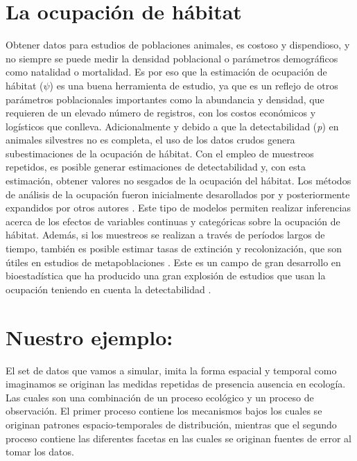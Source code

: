 \documentclass[]{book}
\begin{document}
\chapter{La ocupación de hábitat}\label{occu}

Obtener datos para estudios de poblaciones animales, es costoso y
dispendioso, y no siempre se puede medir la densidad poblacional o
parámetros demográficos como natalidad o mortalidad. Es por eso que la
estimación de ocupación de hábitat (\(\psi\)) es una buena herramienta
de estudio, ya que es un reflejo de otros parámetros poblacionales
importantes como la abundancia y densidad, que requieren de un elevado
número de registros, con los costos económicos y logísticos que
conlleva. Adicionalmente y debido a que la detectabilidad (\emph{p}) en
animales silvestres no es completa, el uso de los datos crudos genera
subestimaciones de la ocupación de hábitat. Con el empleo de muestreos
repetidos, es posible generar estimaciones de detectabilidad y, con esta
estimación, obtener valores no sesgados de la ocupación del hábitat. Los
métodos de análisis de la ocupación fueron inicialmente desarollados por
\citet{MacKenzie2002} y posteriormente expandidos por otros autores
\citep{MACKENZIE2005, MacKenzie2006, Kery2008, Royle2007a, Royle2005, Royle2006}.
Este tipo de modelos permiten realizar inferencias acerca de los efectos
de variables continuas y categóricas sobre la ocupación de hábitat.
Además, si los muestreos se realizan a través de períodos largos de
tiempo, también es posible estimar tasas de extinción y recolonización,
que son útiles en estudios de metapoblaciones \citep{MacKenzie2003}.
Este es un campo de gran desarrollo en bioestadística que ha producido
una gran explosión de estudios que usan la ocupación teniendo en cuenta
la detectabilidad
\citep{Guillera-Arroita2010a, Guillera-Arroita2015, Guillera-Arroita2011, Guillera-Arroita2012, Guillera-Arroita2014a, Kery2013}.

\chapter{Nuestro ejemplo:}\label{example}

El set de datos que vamos a simular, imita la forma espacial y temporal
como imaginamos se originan las medidas repetidas de presencia ausencia
en ecología. Las cuales son una combinación de un proceso ecológico y un
proceso de observación. El primer proceso contiene los mecanismos bajos
los cuales se originan patrones espacio-temporales de distribución,
mientras que el segundo proceso contiene las diferentes facetas en las
cuales se originan fuentes de error al tomar los datos.
\end{document}
